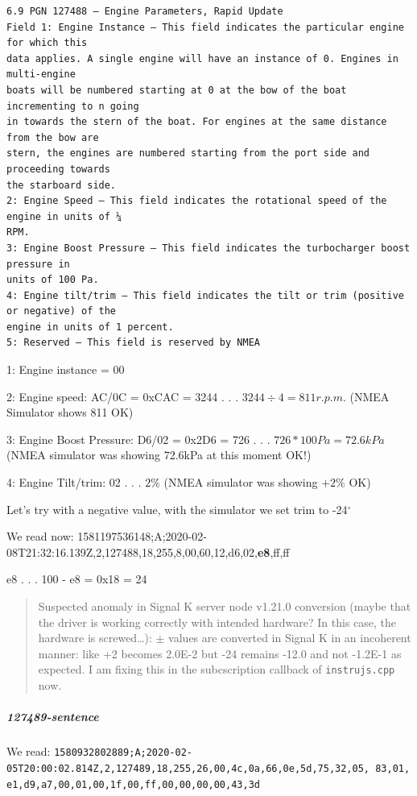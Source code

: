\documentclass[11pt]{article}
\begin{document}
\begin{verbatim}
6.9 PGN 127488 – Engine Parameters, Rapid Update
Field 1: Engine Instance – This field indicates the particular engine for which this
data applies. A single engine will have an instance of 0. Engines in multi-engine
boats will be numbered starting at 0 at the bow of the boat incrementing to n going
in towards the stern of the boat. For engines at the same distance from the bow are
stern, the engines are numbered starting from the port side and proceeding towards
the starboard side.
2: Engine Speed – This field indicates the rotational speed of the engine in units of ¼
RPM.
3: Engine Boost Pressure – This field indicates the turbocharger boost pressure in
units of 100 Pa.
4: Engine tilt/trim – This field indicates the tilt or trim (positive or negative) of the
engine in units of 1 percent.
5: Reserved – This field is reserved by NMEA 
\end{verbatim}

    1: Engine instance = 00

    2: Engine speed: AC/0C = 0xCAC = 3244 . . . \(3244 \div 4 = 811 r.p.m.\)
(NMEA Simulator shows 811 OK)

    3: Engine Boost Pressure: D6/02 = 0x2D6 = 726 . . .
\(726*100Pa=72.6kPa\) (NMEA simulator was showing 72.6kPa at this moment
OK!)

    4: Engine Tilt/trim: 02 . . . \(2\%\) (NMEA simulator was showing
\(+2\%\) OK)

    Let's try with a negative value, with the simulator we set trim to
-24\(^{\circ}\)

    We read now:
1581197536148;A;2020-02-08T21:32:16.139Z,2,127488,18,255,8,00,60,12,d6,02,\textbf{e8},ff,ff

    e8 . . . 100 - e8 = 0x18 = 24

    \begin{quote}
Suspected anomaly in Signal K server node v1.21.0 conversion (maybe that
the driver is working correctly with intended hardware? In this case,
the hardware is screwed\ldots): \(\pm\) values are converted in Signal K
in an incoherent manner: like +2 becomes 2.0E-2 but -24 remains -12.0
and not -1.2E-1 as expected. I am fixing this in the subcscription
callback of \texttt{instrujs.cpp} now.
\end{quote}

    \hypertarget{sentence}{%
\subparagraph{127489-sentence}\label{sentence}}

    We read:
\texttt{1580932802889;A;2020-02-05T20:00:02.814Z,2,127489,18,255,26,00,4c,0a,66,0e,5d,75,32,05,\ 83,01,e1,d9,a7,00,01,00,1f,00,ff,00,00,00,00,43,3d}
\end{document}
